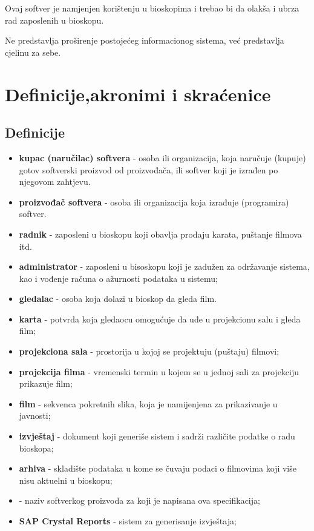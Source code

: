 Ovaj softver je namjenjen korištenju u bioskopima i trebao bi da olakša i ubrza rad zaposlenih u bioskopu.

Ne predstavlja proširenje postojećeg informacionog sistema, već predstavlja cjelinu za sebe.

\section{Definicije,akronimi i skraćenice}
\subsection{Definicije}

\begin{itemize}
\item \textbf{kupac (naručilac) softvera} - osoba ili organizacija, koja naručuje (kupuje) gotov softverski proizvod od proizvođača, ili softver koji je izrađen po njegovom zahtjevu. 
\item \textbf{proizvođač softvera} - osoba ili organizacija koja izrađuje (programira) softver.
\item \textbf{radnik} - zaposleni u bioskopu koji obavlja prodaju karata, puštanje filmova itd.
\item \textbf{administrator} - zaposleni u bisoskopu koji je zadužen za održavanje sistema, kao i vođenje računa o ažurnosti podataka u sistemu;
\item \textbf{gledalac} - osoba koja dolazi u bioskop da gleda film.

\item \textbf{karta} - potvrda koja gledaocu omogućuje da uđe u projekcionu salu i gleda film;

\item \textbf{projekciona sala} - prostorija u kojoj se projektuju (puštaju) filmovi;

\item \textbf{projekcija filma} - vremenski termin u kojem se u jednoj sali za projekciju prikazuje film;

\item \textbf{film} - sekvenca pokretnih slika, koja je namijenjena za prikazivanje u javnosti;

\item \textbf{izvještaj} - dokument koji generiše sistem i sadrži različite podatke o radu bioskopa;

\item \textbf{arhiva} - skladište podataka u kome se čuvaju podaci o filmovima koji više nisu aktuelni u bioskopu;

\item \textbf{\naziv } - naziv softverkog proizvoda za koji je napisana ova specifikacija;

\item \textbf{SAP Crystal Reports} - sistem za generisanje izvještaja;
\end{itemize}

